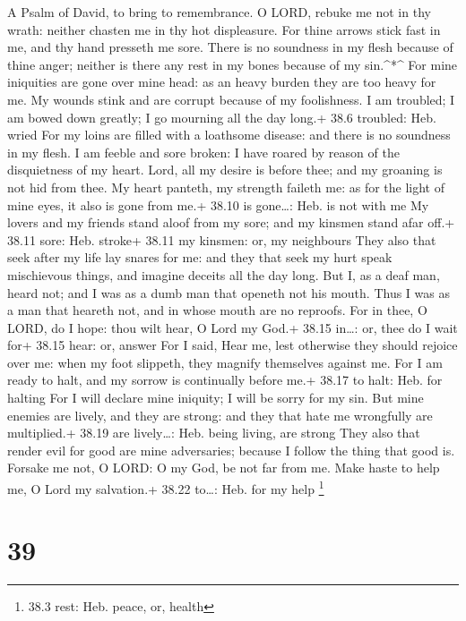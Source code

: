 A Psalm of David, to bring to remembrance.  O LORD, rebuke
me not in thy wrath: neither chasten me in thy hot displeasure.
 For thine arrows stick fast in me, and thy hand presseth me
sore.  There is no soundness in my flesh because of thine
anger; neither is there any rest in my bones because of my sin.\^{}*\^{}
 For mine iniquities are gone over mine head: as an heavy
burden they are too heavy for me.  My wounds stink and are
corrupt because of my foolishness.  I am troubled; I am
bowed down greatly; I go mourning all the day long.+ 38.6 troubled: Heb.
wried  For my loins are filled with a loathsome disease: and
there is no soundness in my flesh.  I am feeble and sore
broken: I have roared by reason of the disquietness of my heart.
 Lord, all my desire is before thee; and my groaning is not
hid from thee.  My heart panteth, my strength faileth me:
as for the light of mine eyes, it also is gone from me.+ 38.10 is
gone\ldots: Heb. is not with me  My lovers and my friends
stand aloof from my sore; and my kinsmen stand afar off.+ 38.11 sore:
Heb. stroke+ 38.11 my kinsmen: or, my neighbours  They also
that seek after my life lay snares for me: and they that seek my hurt
speak mischievous things, and imagine deceits all the day long.
 But I, as a deaf man, heard not; and I was as a dumb man
that openeth not his mouth.  Thus I was as a man that
heareth not, and in whose mouth are no reproofs.  For in
thee, O LORD, do I hope: thou wilt hear, O Lord my God.+ 38.15 in\ldots:
or, thee do I wait for+ 38.15 hear: or, answer  For I said,
Hear me, lest otherwise they should rejoice over me: when my foot
slippeth, they magnify themselves against me.  For I am
ready to halt, and my sorrow is continually before me.+ 38.17 to halt:
Heb. for halting  For I will declare mine iniquity; I will
be sorry for my sin.  But mine enemies are lively, and they
are strong: and they that hate me wrongfully are multiplied.+ 38.19 are
lively\ldots: Heb. being living, are strong  They also that
render evil for good are mine adversaries; because I follow the thing
that good is.  Forsake me not, O LORD: O my God, be not far
from me.  Make haste to help me, O Lord my salvation.+
38.22 to\ldots: Heb. for my help \footnote{38.3 rest: Heb. peace, or,
  health}

\hypertarget{section-38}{%
\section{39}\label{section-38}}

